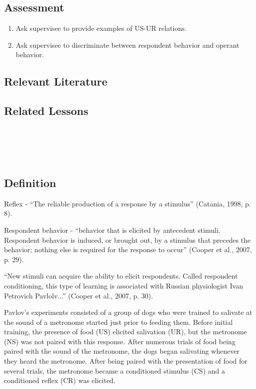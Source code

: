 \subsection{Assessment}
\begin{enumerate}
\item Ask supervisee to provide examples of US-UR relations.
\item Ask supervisee to discriminate between respondent behavior and operant behavior.
%
\end{enumerate}
%
\subsection{Relevant Literature}
\begin{refsection}
\nocite{bijou1961child,
        cooper2007applied,
        pavlov1927conditional}
\printbibliography[heading=none]
\end{refsection}

%
\subsection{Related Lessons}
\fourFKFourteen{}\\
\fourFKFifteen{}\\
\fourFKSixteen{}\\
%
\clearpage \section{\fourFKFourteen{}}
\subsection{Definition} 
Reflex - ``The reliable production of a response by a stimulus'' (Catania, 1998, p. 8).

Respondent behavior - ``behavior that is elicited by antecedent stimuli. Respondent behavior is induced, or brought out, by a stimulus that precedes the behavior; nothing else is required for the response to occur'' (Cooper et al., 2007, p. 29).

``New stimuli can acquire the ability to elicit respondents. Called respondent conditioning, this type of learning is associated with Russian physiologist Ivan Petrovich Pavlolv...'' (Cooper et al., 2007, p. 30).

Pavlov's experiments consisted of a group of dogs who were trained to salivate at the sound of a metronome started just prior to feeding them. Before initial training, the presence of food (US) elicited salivation (UR), but the metronome (NS) was not paired with this response. After numerous trials of food being paired with the sound of the metronome, the dogs began salivating whenever they heard the metronome. After being paired with the presentation of food for several trials, the metronome became a conditioned stimulus (CS) and a conditioned reflex (CR) was elicited. 

